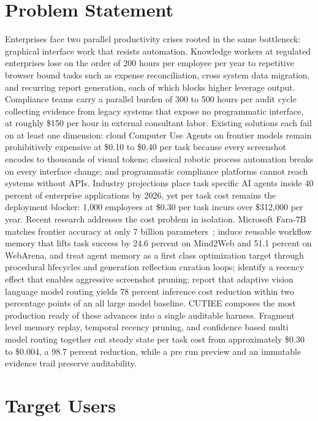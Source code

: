 \documentclass{article}
\theoremstyle{plain}
\theoremstyle{definition}
\theoremstyle{remark}
\begin{document}
\section{Problem Statement}
\label{sec:problem}

Enterprises face two parallel productivity crises rooted in the same bottleneck: graphical interface work that resists automation. Knowledge workers at regulated enterprises lose on the order of 200 hours per employee per year to repetitive browser bound tasks such as expense reconciliation, cross system data migration, and recurring report generation, each of which blocks higher leverage output. Compliance teams carry a parallel burden of 300 to 500 hours per audit cycle collecting evidence from legacy systems that expose no programmatic interface, at roughly \$150 per hour in external consultant labor. Existing solutions each fail on at least one dimension: cloud Computer Use Agents on frontier models remain prohibitively expensive at \$0.10 to \$0.40 per task because every screenshot encodes to thousands of visual tokens; classical robotic process automation breaks on every interface change; and programmatic compliance platforms cannot reach systems without APIs. Industry projections place task specific AI agents inside 40 percent of enterprise applications by 2026, yet per task cost remains the deployment blocker: 1{,}000 employees at \$0.30 per task incurs over \$312{,}000 per year. Recent research addresses the cost problem in isolation. Microsoft Fara-7B matches frontier accuracy at only 7 billion parameters~\cite{fara7b2025}; \citet{wang2024awm} induce reusable workflow memory that lifts task success by 24.6 percent on Mind2Web and 51.1 percent on WebArena, and \citet{fang2025memp,zhang2025ace} treat agent memory as a first class optimization target through procedural lifecycles and generation reflection curation loops; \citet{li2026pruning} identify a recency effect that enables aggressive screenshot pruning; \citet{liu2026avr} report that adaptive vision language model routing yields 78 percent inference cost reduction within two percentage points of an all large model baseline. CUTIEE composes the most production ready of these advances into a single auditable harness. Fragment level memory replay, temporal recency pruning, and confidence based multi model routing together cut steady state per task cost from approximately \$0.30 to \$0.004, a 98.7 percent reduction, while a pre run preview and an immutable evidence trail preserve auditability.

\section{Target Users}
\label{sec:users}
\end{document}
